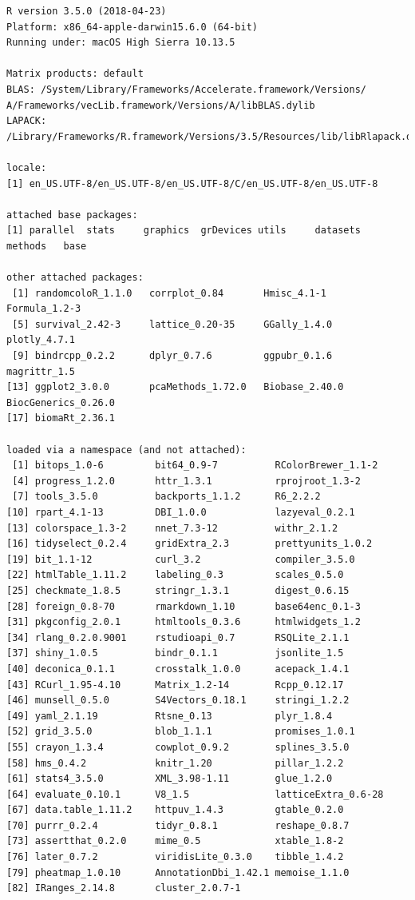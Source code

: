 \documentclass[12pt,]{book}
\theoremstyle{definition}
\theoremstyle{definition}
\theoremstyle{definition}
\theoremstyle{remark}
\begin{document}
\begin{verbatim}
R version 3.5.0 (2018-04-23)
Platform: x86_64-apple-darwin15.6.0 (64-bit)
Running under: macOS High Sierra 10.13.5

Matrix products: default
BLAS: /System/Library/Frameworks/Accelerate.framework/Versions/
A/Frameworks/vecLib.framework/Versions/A/libBLAS.dylib
LAPACK: /Library/Frameworks/R.framework/Versions/3.5/Resources/lib/libRlapack.dylib

locale:
[1] en_US.UTF-8/en_US.UTF-8/en_US.UTF-8/C/en_US.UTF-8/en_US.UTF-8

attached base packages:
[1] parallel  stats     graphics  grDevices utils     datasets  methods   base     

other attached packages:
 [1] randomcoloR_1.1.0   corrplot_0.84       Hmisc_4.1-1         Formula_1.2-3      
 [5] survival_2.42-3     lattice_0.20-35     GGally_1.4.0        plotly_4.7.1       
 [9] bindrcpp_0.2.2      dplyr_0.7.6         ggpubr_0.1.6        magrittr_1.5       
[13] ggplot2_3.0.0       pcaMethods_1.72.0   Biobase_2.40.0      BiocGenerics_0.26.0
[17] biomaRt_2.36.1     

loaded via a namespace (and not attached):
 [1] bitops_1.0-6         bit64_0.9-7          RColorBrewer_1.1-2  
 [4] progress_1.2.0       httr_1.3.1           rprojroot_1.3-2     
 [7] tools_3.5.0          backports_1.1.2      R6_2.2.2            
[10] rpart_4.1-13         DBI_1.0.0            lazyeval_0.2.1      
[13] colorspace_1.3-2     nnet_7.3-12          withr_2.1.2         
[16] tidyselect_0.2.4     gridExtra_2.3        prettyunits_1.0.2   
[19] bit_1.1-12           curl_3.2             compiler_3.5.0      
[22] htmlTable_1.11.2     labeling_0.3         scales_0.5.0        
[25] checkmate_1.8.5      stringr_1.3.1        digest_0.6.15       
[28] foreign_0.8-70       rmarkdown_1.10       base64enc_0.1-3     
[31] pkgconfig_2.0.1      htmltools_0.3.6      htmlwidgets_1.2     
[34] rlang_0.2.0.9001     rstudioapi_0.7       RSQLite_2.1.1       
[37] shiny_1.0.5          bindr_0.1.1          jsonlite_1.5        
[40] deconica_0.1.1       crosstalk_1.0.0      acepack_1.4.1       
[43] RCurl_1.95-4.10      Matrix_1.2-14        Rcpp_0.12.17        
[46] munsell_0.5.0        S4Vectors_0.18.1     stringi_1.2.2       
[49] yaml_2.1.19          Rtsne_0.13           plyr_1.8.4          
[52] grid_3.5.0           blob_1.1.1           promises_1.0.1      
[55] crayon_1.3.4         cowplot_0.9.2        splines_3.5.0       
[58] hms_0.4.2            knitr_1.20           pillar_1.2.2        
[61] stats4_3.5.0         XML_3.98-1.11        glue_1.2.0          
[64] evaluate_0.10.1      V8_1.5               latticeExtra_0.6-28 
[67] data.table_1.11.2    httpuv_1.4.3         gtable_0.2.0        
[70] purrr_0.2.4          tidyr_0.8.1          reshape_0.8.7       
[73] assertthat_0.2.0     mime_0.5             xtable_1.8-2        
[76] later_0.7.2          viridisLite_0.3.0    tibble_1.4.2        
[79] pheatmap_1.0.10      AnnotationDbi_1.42.1 memoise_1.1.0       
[82] IRanges_2.14.8       cluster_2.0.7-1 
\end{verbatim}
\end{document}
